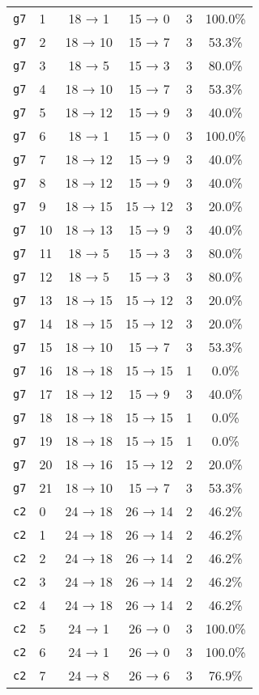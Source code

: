 \begin{tabular}{llcccc}
\texttt{g7} & 1 & 18 → 1 & 15 → 0 & 3 & 100.0\% \\
\texttt{g7} & 2 & 18 → 10 & 15 → 7 & 3 & 53.3\% \\
\texttt{g7} & 3 & 18 → 5 & 15 → 3 & 3 & 80.0\% \\
\texttt{g7} & 4 & 18 → 10 & 15 → 7 & 3 & 53.3\% \\
\texttt{g7} & 5 & 18 → 12 & 15 → 9 & 3 & 40.0\% \\
\texttt{g7} & 6 & 18 → 1 & 15 → 0 & 3 & 100.0\% \\
\texttt{g7} & 7 & 18 → 12 & 15 → 9 & 3 & 40.0\% \\
\texttt{g7} & 8 & 18 → 12 & 15 → 9 & 3 & 40.0\% \\
\texttt{g7} & 9 & 18 → 15 & 15 → 12 & 3 & 20.0\% \\
\texttt{g7} & 10 & 18 → 13 & 15 → 9 & 3 & 40.0\% \\
\texttt{g7} & 11 & 18 → 5 & 15 → 3 & 3 & 80.0\% \\
\texttt{g7} & 12 & 18 → 5 & 15 → 3 & 3 & 80.0\% \\
\texttt{g7} & 13 & 18 → 15 & 15 → 12 & 3 & 20.0\% \\
\texttt{g7} & 14 & 18 → 15 & 15 → 12 & 3 & 20.0\% \\
\texttt{g7} & 15 & 18 → 10 & 15 → 7 & 3 & 53.3\% \\
\texttt{g7} & 16 & 18 → 18 & 15 → 15 & 1 & 0.0\% \\
\texttt{g7} & 17 & 18 → 12 & 15 → 9 & 3 & 40.0\% \\
\texttt{g7} & 18 & 18 → 18 & 15 → 15 & 1 & 0.0\% \\
\texttt{g7} & 19 & 18 → 18 & 15 → 15 & 1 & 0.0\% \\
\texttt{g7} & 20 & 18 → 16 & 15 → 12 & 2 & 20.0\% \\
\texttt{g7} & 21 & 18 → 10 & 15 → 7 & 3 & 53.3\% \\
\texttt{c2} & 0 & 24 → 18 & 26 → 14 & 2 & 46.2\% \\
\texttt{c2} & 1 & 24 → 18 & 26 → 14 & 2 & 46.2\% \\
\texttt{c2} & 2 & 24 → 18 & 26 → 14 & 2 & 46.2\% \\
\texttt{c2} & 3 & 24 → 18 & 26 → 14 & 2 & 46.2\% \\
\texttt{c2} & 4 & 24 → 18 & 26 → 14 & 2 & 46.2\% \\
\texttt{c2} & 5 & 24 → 1 & 26 → 0 & 3 & 100.0\% \\
\texttt{c2} & 6 & 24 → 1 & 26 → 0 & 3 & 100.0\% \\
\texttt{c2} & 7 & 24 → 8 & 26 → 6 & 3 & 76.9\% \\

\end{tabular}
